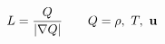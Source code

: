 \documentclass[preview]{standalone}
\begin{document}
\begin{align*}
\special{dvisvgm:raw <g id='unique000'>}L=\frac{Q}{|\nabla Q|}\qquad Q=\rho,\ T,\ \va u\special{dvisvgm:raw </g>}
\end{align*}
\end{document}
